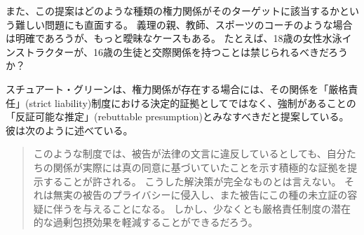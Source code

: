 \documentclass[paper=a4,book,openany]{jlreq}
\newcommand{\ig}[1]{}           %
\begin{document}
また、この提案はどのような種類の権力関係がそのターゲットに該当するかという難しい問題にも直面する。
義理の親、教師、スポーツのコーチのような場合は明確であろうが、もっと曖昧なケースもある。
たとえば、18歳の女性水泳インストラクターが、16歳の生徒と交際関係を持つことは禁じられるべきだろうか？

スチュアート・グリーン\ig{Stuart Green}は、権力関係が存在する場合には、その関係を「厳格責任」(strict liability)制度における決定的証拠としてではなく、強制があることの「反証可能な推定」(rebuttable presumption)とみなすべきだと提案している。
彼は次のように述べている。

\begin{quote}
このような制度では、被告が法律の文言に違反しているとしても、自分たちの関係が実際には真の同意に基づいていたことを示す積極的な証拠を提示することが許される。
こうした解決策が完全なものとは言えない。
それは無実の被告のプライバシーに侵入し、また被告にこの種の未立証の容疑に伴うを与えることになる。
しかし、少なくとも厳格責任制度の潜在的な過剰包摂効果を軽減することができるだろう。
\citep{green17:_how_crimin_inces}
\end{quote}
\end{document}
